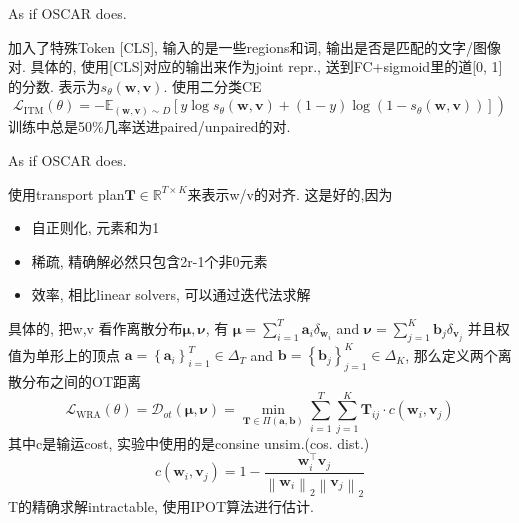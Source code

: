 \documentclass{article}
\begin{document}
\begin{remark}
    As if OSCAR does.
\end{remark}

 加入了特殊Token [CLS], 输入的是一些regions和词, 输出是否是匹配的文字/图像对. 具体的, 使用[CLS]对应的输出来作为joint repr., 送到FC+sigmoid里的道[0, 1]的分数. 表示为$s_{\theta}(\mathbf{w}, \mathbf{v})$. 使用二分类CE
\begin{equation}
    \left.\mathcal{L}_{\mathrm{ITM}}(\theta)=-\mathbb{E}_{(\mathbf{w}, \mathbf{v}) \sim D}\left[y \log s_{\theta}(\mathbf{w}, \mathbf{v})+(1-y) \log \left(1-s_{\theta}(\mathbf{w}, \mathbf{v})\right)\right]\right)
\end{equation}
训练中总是50\%几率送进paired/unpaired的对.

\begin{remark}
    As if OSCAR does.
\end{remark}

使用transport plan$\mathbf{T} \in \mathbb{R}^{T \times K}$来表示w/v的对齐. 这是好的,因为
\begin{itemize}
    \item 自正则化, 元素和为1
    \item 稀疏, 精确解必然只包含2r-1个非0元素
    \item 效率, 相比linear solvers, 可以通过迭代法求解
\end{itemize}
具体的, 把w,v 看作离散分布$\boldsymbol{\mu}, \boldsymbol{\nu}$, 有
$\boldsymbol{\mu}=\sum_{i=1}^{T} \mathbf{a}_{i} \delta_{\mathbf{w}_{i}}$ and $\boldsymbol{\nu}=\sum_{j=1}^{K} \mathbf{b}_{j} \delta_{\mathbf{v}_{j}}$
并且权值为单形上的顶点
$\mathbf{a}=\left\{\mathbf{a}_{i}\right\}_{i=1}^{T} \in \Delta_{T}$ and $\mathbf{b}=\left\{\mathbf{b}_{j}\right\}_{j=1}^{K} \in \Delta_{K}$, 那么定义两个离散分布之间的OT距离
\begin{equation}
    \mathcal{L}_{\mathrm{WRA}}(\theta)=\mathcal{D}_{o t}(\boldsymbol{\mu}, \boldsymbol{\nu})=\min _{\mathbf{T} \in \Pi(\mathbf{a}, \mathbf{b})} \sum_{i=1}^{T} \sum_{j=1}^{K} \mathbf{T}_{i j} \cdot c\left(\mathbf{w}_{i}, \mathbf{v}_{j}\right)
\end{equation}
其中c是输运cost, 实验中使用的是consine unsim.(cos. dist.) 
\begin{equation}
    c\left(\mathbf{w}_{i}, \mathbf{v}_{j}\right)=1-\frac{\mathbf{w}_{i}^{\top} \mathbf{v}_{j}}{\left\|\mathbf{w}_{i}\right\|_{2}\left\|\mathbf{v}_{j}\right\|_{2}}
\end{equation}
T的精确求解intractable, 使用IPOT算法进行估计.
\end{document}
